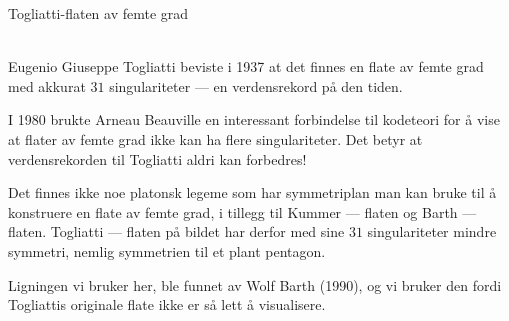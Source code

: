 \documentclass[no]{./../../common/SurferDesc}%
\begin{document}
\footnotesize


\begin{surferPage}
  \begin{surferTitle}Togliatti-flaten av femte grad\end{surferTitle}  \\

Eugenio Giuseppe Togliatti beviste i 1937 at det finnes en flate av femte grad med akkurat $31$ singulariteter --- en verdensrekord på den tiden. 

I 1980 brukte Arneau Beauville en interessant forbindelse til kodeteori for å vise at flater av femte grad ikke kan ha flere singulariteter. Det betyr at verdensrekorden til Togliatti aldri kan forbedres! 
	
Det finnes ikke noe platonsk legeme som har symmetriplan man kan bruke til å konstruere en flate av femte grad, i tillegg til Kummer --- flaten og Barth ---flaten. Togliatti --- flaten på bildet har derfor med sine $31$ singulariteter mindre symmetri, nemlig symmetrien til et plant pentagon.  

Ligningen vi bruker her, ble funnet av Wolf Barth (1990), og vi bruker den fordi Togliattis originale flate ikke er så lett å visualisere.




  \begin{surferText}
     \end{surferText}
\end{surferPage}
\end{document}
